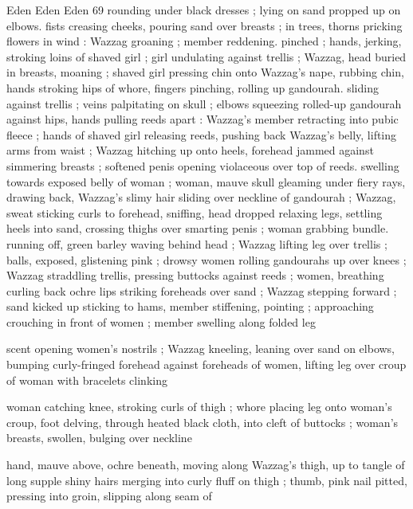 Eden Eden Eden 69
rounding under black dresses ; lying on sand propped up on elbows.
fists creasing cheeks, pouring sand over breasts ; in trees, thorns
pricking flowers in wind : Wazzag groaning ; member reddening.
pinched ; hands, jerking, stroking loins of shaved girl ; girl
undulating against trellis ; Wazzag, head buried in breasts, moaning
; shaved girl pressing chin onto Wazzag's nape, rubbing chin, hands
stroking hips of whore, fingers pinching, rolling up gandourah.
sliding against trellis ; veins palpitating on skull ; elbows squeezing
rolled-up gandourah against hips, hands pulling reeds apart :
Wazzag's member retracting into pubic fleece ; hands of shaved girl
releasing reeds, pushing back Wazzag's belly, lifting arms from waist
; Wazzag hitching up onto heels, forehead jammed against simmering
breasts ; softened penis opening violaceous over top of reeds.
swelling towards exposed belly of woman ; woman, mauve skull
gleaming under fiery rays, drawing back, Wazzag's slimy hair sliding
over neckline of gandourah ; Wazzag, sweat sticking curls to
forehead, sniffing, head dropped relaxing legs, settling heels into
sand, crossing thighs over smarting penis ; woman grabbing bundle.
running off, green barley waving behind head ; Wazzag lifting leg
over trellis ; balls, exposed, glistening pink ; drowsy women rolling
gandourahs up over knees ; Wazzag straddling trellis, pressing
buttocks against reeds ; women, breathing curling back ochre lips
striking foreheads over sand ; Wazzag stepping forward ; sand kicked
up sticking to hams, member stiffening, pointing ; approaching
crouching in front of women ; member swelling along folded leg

scent opening women's nostrils ; Wazzag kneeling, leaning over sand
on elbows, bumping curly-fringed forehead against foreheads of
women, lifting leg over croup of woman with bracelets clinking

woman catching knee, stroking curls of thigh ; whore placing leg
onto woman's croup, foot delving, through heated black cloth, into
cleft of buttocks ; woman's breasts, swollen, bulging over neckline

hand, mauve above, ochre beneath, moving along Wazzag's thigh, up
to tangle of long supple shiny hairs merging into curly fluff on thigh
; thumb, pink nail pitted, pressing into groin, slipping along seam of

